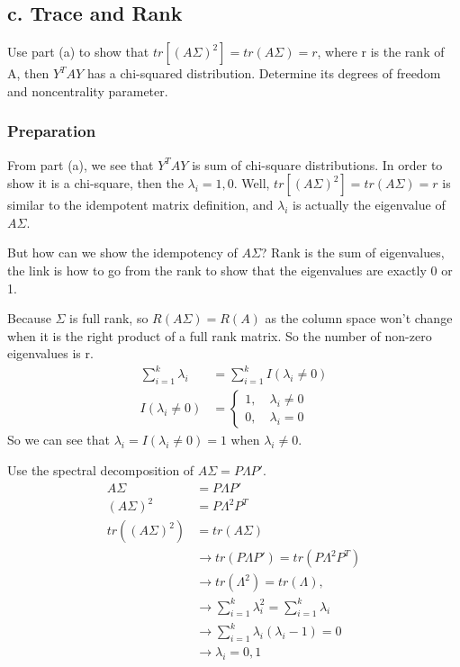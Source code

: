 \documentclass[11pt]{article} %
\begin{document}
\subsection{c. Trace and Rank}

 Use part (a) to show that $tr[(A\Sigma)^2] = tr(A \Sigma) = r$, where r is the rank of
A, then $Y^TAY$ has a chi-squared distribution. Determine its degrees of freedom and noncentrality parameter.

\subsubsection{Preparation}
From part (a), we see that $Y^TAY$ is sum of chi-square distributions. In order to show it is a chi-square, then the $\lambda_i = 1, 0$. Well,  $tr[(A\Sigma)^2] = tr(A \Sigma) = r$ is similar to the idempotent matrix definition, and $\lambda_i $ is actually the eigenvalue of $A\Sigma$. 

But how can we show the idempotency of $A\Sigma$? Rank is the sum of eigenvalues, the link is how to go from the rank to show that the eigenvalues are exactly 0 or 1. 

Because $\Sigma$ is full rank, so $R(A\Sigma) = R(A)$ as the column space won't change when it is the right product of a full rank matrix. So the number of non-zero eigenvalues is r.
\begin{align*}
	\sum_{i=1}^k \lambda_i & = \sum_{i=1}^k I(\lambda_i \neq 0) \\
	I(\lambda_i \neq 0) & = \begin{cases*}
	1, \quad \lambda_i \neq 0\\
	0, \quad \lambda_i =0
\end{cases*}
\end{align*}
So we can see that $\lambda_i = I(\lambda_i \neq 0) = 1$ when $\lambda_i \neq 0$.

Use the spectral decomposition of $A\Sigma = P \Lambda P'$. 
\begin{align*}
	A\Sigma & = P \Lambda P'\\
	(A\Sigma)^2 &= P \Lambda^2 P^T\\
	tr((A\Sigma)^2) &= tr(A\Sigma) \\
	& \rightarrow tr(P \Lambda P') = tr(P \Lambda^2 P^T)\\
	& \rightarrow tr(\Lambda^2) = tr(\Lambda), \\
	& \rightarrow \sum_{i=1}^k \lambda_i^2 = \sum_{i=1}^k \lambda_i \\
	& \rightarrow \sum_{i=1}^k \lambda_i (\lambda_i -1) = 0 \\
	& \rightarrow \lambda_i = 0, 1
\end{align*}
\end{document}
